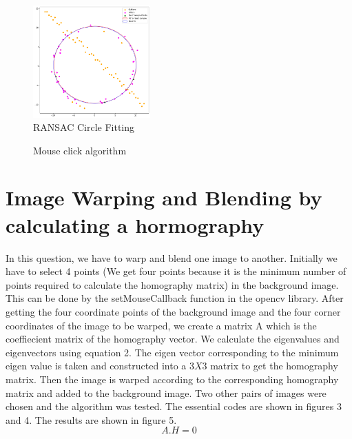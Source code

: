 \documentclass[10.5pt]{article}
\begin{document}
\begin{flushleft}
\begin{figure}[htp]
    \centering
    \includegraphics[width=0.4\textwidth]{Question1output.png}
    \caption{RANSAC Circle Fitting}
\end{figure}

\begin{figure}
    \qquad
    \caption{Mouse click algorithm}
    \label{fig:example}
\end{figure}
\section{Image Warping and Blending by calculating a hormography}
In this question, we have to warp and blend one image to another. Initially we have to select 4 points (We get four points because it is the minimum number of points required to calculate the homography matrix) in the background image. This can be done by the setMouseCallback function in the opencv library. After getting the four coordinate points of the background image and the four corner coordinates of the image to be warped, we create a matrix A which is the coeffiecient matrix of the homography vector. We calculate the eigenvalues and eigenvectors using equation 2. The eigen vector corresponding to the minimum eigen value is taken and constructed into a $3X3$ matrix to get the homography matrix. Then the image is warped according to the corresponding homography matrix and added to the background image.
Two other pairs of images were chosen and the algorithm was tested. The essential codes are shown in figures 3 and 4. The results are shown in figure 5.
\begin{equation}\label{Equation 2: hormography equation}
     A.H = 0
\end{equation}


\end{flushleft}
\end{document}
